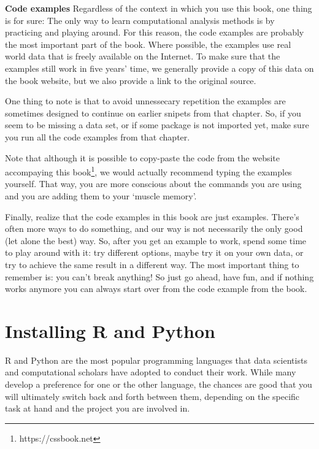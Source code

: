 \begin{feature}\textbf{Code examples}
Regardless of the context in which you use this book, one thing is for sure:
The only way to learn computational analysis methods is by practicing and playing around.
For this reason, the code examples are probably the most important part of the book.
Where possible, the examples use real world data that is freely available on the Internet.
To make sure that the examples still work in five years' time,
we generally provide a copy of this data on the book website,
but we also provide a link to the original source.

One thing to note is that to avoid unnessecary repetition
the examples are sometimes designed to continue on earlier
snipets from that chapter.
So, if you seem to be missing a data set, or if some package is not imported yet,
make sure you run all the code examples from that chapter.

Note that although it is possible to copy-paste the code from the website accompaying this book\footnote{https://cssbook.net},
we would actually recommend typing the examples yourself.
That way, you are more conscious about the commands you are using and you are adding them to your `muscle memory'.

Finally, realize that the code examples in this book are just examples.
There's often more ways to do something, and our way is not necessarily the only good (let alone the best) way.
So, after you get an example to work, spend some time to play around with it:
try different options, maybe try it on your own data, or try to achieve the same result in a different way.
The most important thing to remember is: you can't break anything!
So just go ahead, have fun, and if nothing works anymore you can always start over from the code example from the book. 
\end{feature}



\section{Installing R and Python}
\label{sec:installing}

R and Python are the most popular programming languages that data
scientists and computational scholars have adopted to conduct their
work. While many develop a preference
for  one or the other language, the chances are good that you
will ultimately switch back and forth between them, depending on
the specific task at hand and the project you are involved in.

